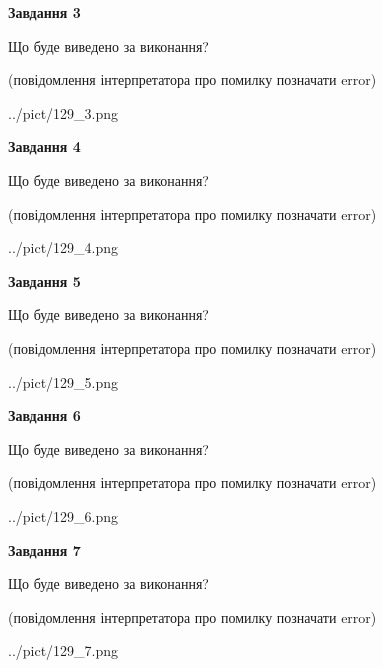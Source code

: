 \documentclass[12pt, ukrainian]{article}
\begin{document}
{\begin {large}
{\begin {center}\textbf{Завдання 3}\end {center}}\par
Що буде виведено за виконання?\par
 (повідомлення інтерпретатора про помилку позначати error)\par
\begin{center}
	{../pict/129_3.png}
\end{center}
\newpage

{\begin {center}\textbf{Завдання 4}\end {center}}\par
Що буде виведено за виконання?\par
 (повідомлення інтерпретатора про помилку позначати error)\par
\begin{center}
	{../pict/129_4.png}
\end{center}
\newpage

{\begin {center}\textbf{Завдання 5}\end {center}}\par
Що буде виведено за виконання?\par
 (повідомлення інтерпретатора про помилку позначати error)\par
\begin{center}
	{../pict/129_5.png}
\end{center}
\newpage

{\begin {center}\textbf{Завдання 6}\end {center}}\par
Що буде виведено за виконання?\par
 (повідомлення інтерпретатора про помилку позначати error)\par
\begin{center}
	{../pict/129_6.png}
\end{center}
\newpage

{\begin {center}\textbf{Завдання 7}\end {center}}\par
Що буде виведено за виконання?\par
 (повідомлення інтерпретатора про помилку позначати error)\par
\begin{center}
	{../pict/129_7.png}
\end{center}
\newpage


\end{large}}
\end{document}
